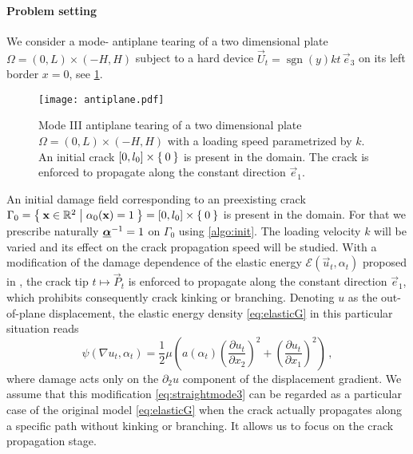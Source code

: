 \paragraph{Problem setting} We consider a mode- antiplane tearing of a two dimensional plate $\Omega=(0,L)\times(-H,H)$ subject to a hard device $\vec{U}_t=\operatorname{sgn}(y)kt\,\vec{e}_3$ on its left border $x=0$, see \cref{fig:antiplane}.
\begin{figure}[htbp]
\centering
\texttt{[image: antiplane.pdf]}
\caption{Mode III antiplane tearing of a two dimensional plate $\Omega=(0,L)\times(-H,H)$ with a loading speed parametrized by $k$. An initial crack $[0,l_0]\times\Set{0}$ is present in the domain. The crack is enforced to propagate along the constant direction $\vec{e}_1$.} \label{fig:antiplane}
\end{figure}
An initial damage field corresponding to an preexisting crack $\Gamma_0=\set{\vec{x}\in\mathbb{R}^2|\alpha_0(\vec{x})=1}=[0,l_0]\times\set{0}$ is present in the domain. For that we prescribe naturally $\dvec^{-1}=1$ on $\Gamma_0$ using \cref{algo:init}. The loading velocity $k$ will be varied and its effect on the crack propagation speed will be studied. With a modification of the damage dependence of the elastic energy $\mathcal{E}(\vec{u}_t,\alpha_t)$ proposed in \cite{Bourdin:2011}, the crack tip $t\mapsto\vec{P}_t$ is enforced to propagate along the constant direction $\vec{e}_1$, which prohibits consequently crack kinking or branching. Denoting $u$ as the out-of-plane displacement, the elastic energy density \eqref{eq:elasticG} in this particular situation reads
\begin{equation} \label{eq:straightmode3}
\psi(\nabla u_t,\alpha_t)=\frac{1}{2}\mu\left(a(\alpha_t)\left(\frac{\partial u_t}{\partial x_2}\right)^2+\left(\frac{\partial u_t}{\partial x_1}\right)^2\right)\,,
\end{equation}
where damage acts only on the $\partial_2 u$ component of the displacement gradient. We assume that this modification \eqref{eq:straightmode3} can be regarded as a particular case of the original model \eqref{eq:elasticG} when the crack actually propagates along a specific path without kinking or branching. It allows us to focus on the crack propagation stage.

